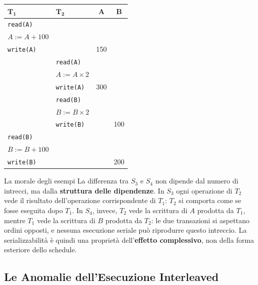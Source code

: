\documentclass[12pt]{extarticle}
\begin{document}
\begin{center}
\small
\begin{tabular}{@{}llcc@{}}
    \toprule
    $\boldsymbol{T_1}$ & $\boldsymbol{T_2}$ & $\boldsymbol{A}$ & $\boldsymbol{B}$ \\
    \midrule
    \texttt{read(A)}       &      &      &      \\
    $A := A + 100$         &      &      &      \\
    \texttt{write(A)}      &      & 150  &      \\
     & \texttt{read(A)}       &      &      \\
     & $A := A \times 2$      &      &      \\
     & \texttt{write(A)}      & 300  &      \\
     & \texttt{read(B)}       &      &      \\
     & $B := B \times 2$      &      &      \\
     & \texttt{write(B)}      &      & 100  \\
    \texttt{read(B)}       &      &      &      \\
    $B := B + 100$         &      &      &      \\
    \texttt{write(B)}      &      &      & 200  \\
    \bottomrule
\end{tabular}
\end{center}

\begin{cbox}{La morale degli esempi}
\noindent La differenza tra $S_3$ e $S_4$ non dipende dal numero di intrecci, ma dalla \textbf{struttura delle dipendenze}. In $S_3$ ogni operazione di $T_2$ vede il risultato dell'operazione corrispondente di $T_1$: $T_2$ si comporta come se fosse eseguita dopo $T_1$. In $S_4$, invece, $T_2$ vede la scrittura di $A$ prodotta da $T_1$, mentre $T_1$ vede la scrittura di $B$ prodotta da $T_2$: le due transazioni si aspettano ordini opposti, e nessuna esecuzione seriale può riprodurre questo intreccio. La serializzabilità è quindi una proprietà dell'\textbf{effetto complessivo}, non della forma esteriore dello schedule.
\end{cbox}

\subsection{Le Anomalie dell'Esecuzione Interleaved}
\end{document}
